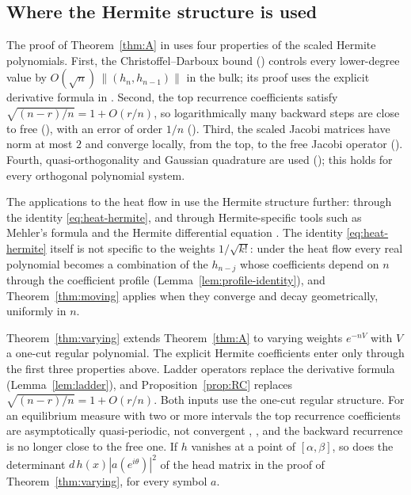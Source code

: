\documentclass[11pt]{amsart}
\theoremstyle{definition}
\theoremstyle{remark}
\numberwithin{equation}{section}
\begin{document}
\subsection{Where the Hermite structure is used}\label{subsec:hermite}
The proof of Theorem~\ref{thm:A} in \cite{Main} uses four properties of the scaled Hermite polynomials. First, the Christoffel--Darboux bound (\cite[Lemma~\ref{M-lem:cd}]{Main}) controls every lower-degree value by $O(\sqrt n)\,\|(h_n,h_{n-1})\|$ in the bulk; its proof uses the explicit derivative formula in \cite[\eqref{M-eq:recurrence}]{Main}. Second, the top recurrence coefficients satisfy $\sqrt{(n-r)/n}=1+O(r/n)$, so logarithmically many backward steps are close to free (\cite[Lemma~\ref{M-lem:transfer}]{Main}), with an error of order $1/n$ (\cite[Lemma~\ref{M-lem:head-rate}]{Main}). Third, the scaled Jacobi matrices have norm at most $2$ and converge locally, from the top, to the free Jacobi operator (\cite[Proposition~\ref{M-prop:exterior}]{Main}). Fourth, quasi-orthogonality and Gaussian quadrature are used (\cite[Lemma~\ref{M-lem:quasi}]{Main}); this holds for every orthogonal polynomial system.

The applications to the heat flow in \cite{Main,CompB} use the Hermite structure further: through the identity \eqref{eq:heat-hermite}, and through Hermite-specific tools such as Mehler's formula \cite[Lemma~\ref{M-lem:mehler}]{Main} and the Hermite differential equation \cite[Section~\ref{M-sec:firstorder}]{Main}. The identity \eqref{eq:heat-hermite} itself is not specific to the weights $1/\sqrt{k!}$: under the heat flow every real polynomial becomes a combination of the $h_{n-j}$ whose coefficients depend on $n$ through the coefficient profile (Lemma~\ref{lem:profile-identity}), and Theorem~\ref{thm:moving} applies when they converge and decay geometrically, uniformly in $n$.

Theorem~\ref{thm:varying} extends Theorem~\ref{thm:A} to varying weights $e^{-nV}$ with $V$ a one-cut regular polynomial. The explicit Hermite coefficients enter \cite[Sections~{\ref{M-sec:transfer}}--{\ref{M-sec:exterior}}]{Main} only through the first three properties above. Ladder operators replace the derivative formula (Lemma~\ref{lem:ladder}), and Proposition~\ref{prop:RC} replaces $\sqrt{(n-r)/n}=1+O(r/n)$. Both inputs use the one-cut regular structure. For an equilibrium measure with two or more intervals the top recurrence coefficients are asymptotically quasi-periodic, not convergent \cite{DKMVZ}, \cite[(12.9), (12.14)]{Bl}, and the backward recurrence is no longer close to the free one. If $h$ vanishes at a point of $[\alpha,\beta]$, so does the determinant $d\,h(x)|a(e^{i\theta})|^2$ of the head matrix in the proof of Theorem~\ref{thm:varying}, for every symbol $a$.
\end{document}
